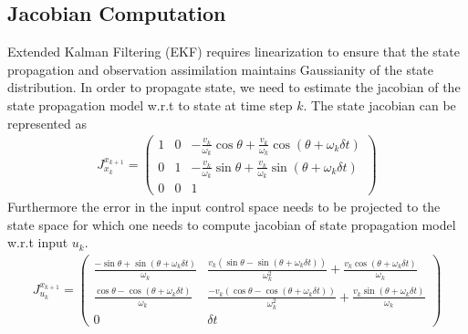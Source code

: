 \documentclass[conference]{IEEEtran}
\begin{document}
\subsection{Jacobian Computation}
Extended Kalman Filtering (EKF) requires linearization to ensure that the state propagation and observation assimilation maintains Gaussianity of the state distribution. In order to propagate state, we need to estimate the jacobian of the state propagation model w.r.t to state at time step $k$. The state jacobian can be represented as
\begin{align}
J^{x_{k+1}}_{x_k} = 
\begin{pmatrix}
1 & 0 & -\frac{v_k}{\omega_k} \cos{\theta} + \frac{v_k}{\omega_k}\cos(\theta+\omega_k \delta t)\\
0 & 1 & -\frac{v_k}{\omega_k} \sin{\theta} + \frac{v_k}{\omega_k}\sin(\theta+\omega_k \delta t) \\
0 & 0 & 1
\end{pmatrix}
\end{align}
Furthermore the error in the input control space needs to be projected to the state space for which one needs to compute jacobian of state propagation model w.r.t input $u_k$. 
\begin{align}
J_{u_k}^{x_{k+1}} = 
\begin{pmatrix}
\frac{-\sin{\theta}+\sin(\theta+\omega_k \delta t)}{\omega_k} & \frac{v_k(\sin{\theta}-\sin(\theta+\omega_k \delta t))}{\omega_k^2} + \frac{v_k\cos(\theta+\omega_k \delta t)}{\omega_k} \\
\frac{\cos{\theta}-\cos(\theta+\omega_k \delta t)}{\omega_k} & \frac{-v_k(\cos{\theta}-\cos(\theta+\omega_k \delta t))}{\omega_k^2} + \frac{v_k\sin(\theta+\omega_k \delta t)}{\omega_k} \\
0 & \delta t 
\end{pmatrix}
\end{align}
\end{document}
